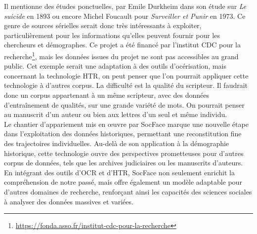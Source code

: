 Il mentionne des études ponctuelles, par Emile Durkheim dans son étude sur \textit{Le suicide} en 1893 ou encore Michel Foucault pour \textit{Surveiller et Punir} en 1973. Ce genre de sources sérielles serait donc très intéressants à exploiter, particulièrement pour les informations qu’elles peuvent fournir pour les chercheurs et démographes. Ce projet a été financé par l'institut CDC pour la recherche\footnote{\href{Institut CDC pour la recherche}{https://fonda.asso.fr/institut-cdc-pour-la-recherche}}, mais les données issues du projet ne sont pas accessibles au grand public. 
Cet exemple serait une adaptation à des outils d’océrisation, mais concernant la technologie HTR, on peut penser que l’on pourrait appliquer cette technologie à d’autres corpus. La difficulté est la qualité du scripteur. Il faudrait donc un corpus appartenant à un même scripteur, avec des données d’entraînement de qualités, sur une grande variété de mots. On pourrait penser au manuscrit d’un auteur ou bien aux lettres d’un seul et même individu.\\

Le chantier d'appariement mis en œuvre par SocFace marque une nouvelle étape dans l'exploitation des données historiques, permettant une reconstitution fine des trajectoires individuelles. Au-delà de son application à la démographie historique, cette technologie ouvre des perspectives prometteuses pour d'autres corpus de données, tels que les archives judiciaires ou les manuscrits d'auteurs. En intégrant des outils d'OCR et d'HTR, SocFace non seulement enrichit la compréhension de notre passé, mais offre également un modèle adaptable pour d'autres domaines de recherche, renforçant ainsi les capacités des sciences sociales à analyser des données massives et variées.
